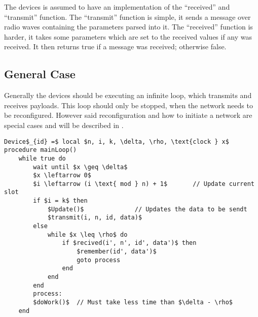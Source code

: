 The devices is assumed to have an implementation of the \enquote{received} and \enquote{transmit} function.
The \enquote{transmit} function is simple, it sends a message over radio waves containing the parameters parsed into it.
The \enquote{received} function is harder, it takes some parameters which are set to the received values if any was received. 
It then returns true if a message was received; otherwise false.
                    
\subsection{General Case} %
\label{sub:general_case}
Generally the devices should be executing an infinite loop, which transmits and receives payloads.
This loop should only be stopped, when the network needs to be reconfigured.
However said reconfiguration and how to initiate a network are special cases and will be described in .

\begin{lstlisting}[style=pseudocode,mathescape=true,caption={Pseudocode example of the main loop}] 
Device$_{id} =$ local $n, i, k, \delta, \rho, \text{clock } x$ 
procedure mainLoop()
	while true do
		wait until $x \geq \delta$
		$x \leftarrow 0$
		$i \leftarrow (i \text{ mod } n) + 1$		// Update current slot
		if $i = k$ then
			$Update()$				// Updates the data to be sendt
			$transmit(i, n, id, data)$
		else 
			while $x \leq \rho$ do
				if $recived(i', n', id', data')$ then
					$remember(id', data')$
					goto process
				end
			end
		end
		process:
		$doWork()$	// Must take less time than $\delta - \rho$	
	end
\end{lstlisting}  

            
